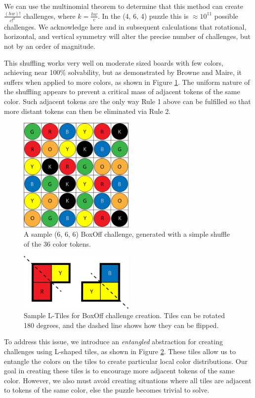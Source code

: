 \documentclass[journal]{IEEEtran}
\begin{document}
We can use the multinomial theorem to determine that this method can create
$\frac{(hw)!}{c!^{k}}$ challenges, where $k=\frac{hw}{c}$. In the (4, 6, 4) puzzle this is $\approx 10^{11}$ possible challenges.  We acknowledge here and in subsequent calculations that rotational, horizontal, and vertical symmetry will alter the precise number of challenges, but not by an order of magnitude.

This shuffling works very well on moderate sized boards with few colors, achieving near 100\% solvability, but as demonstrated by Browne and Maire, it suffers when applied to more colors, as shown in Figure \ref{fig:boxoff666}. The uniform nature of the shuffling appears to prevent a critical mass of adjacent tokens of the same color. Such adjacent tokens are the only way Rule 1 above can be fulfilled so that more distant tokens can then be eliminated via Rule 2.

\begin{figure}[t]
\centering
\includegraphics[width=5.6cm]{figure3.png}
\caption{A sample (6, 6, 6) BoxOff challenge, generated with a simple shuffle of the 36 color tokens. }
\label{fig:boxoff666}
\end{figure}


\begin{figure}[t]
\centering
\includegraphics[width=5.6cm]{figure4.png}
\caption{Sample L-Tiles for BoxOff challenge creation. Tiles can be rotated 180 degrees, and the dashed line shows how they can be flipped. }
\label{fig:ltiles}
\end{figure}

To address this issue, we introduce an {\it entangled} abstraction for creating challenges using L-shaped tiles, as shown in Figure \ref{fig:ltiles}. These tiles allow us to entangle the colors on the tiles to create particular local color distributions.
Our goal in creating these tiles is to encourage more adjacent tokens of the same color. However, we also must avoid creating situations where all tiles are adjacent to tokens of the same color, else the puzzle becomes trivial to solve. 
\end{document}
